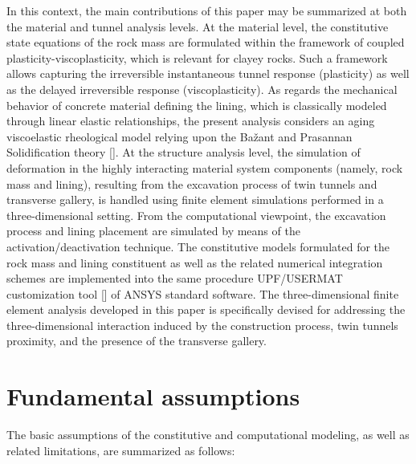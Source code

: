 \documentclass[a4paper,fleqn]{cas-sc}
\begin{document}
In this context, the main contributions of this paper may be summarized at both the material and tunnel analysis levels. At the material level, the constitutive state equations of the rock mass are formulated within the framework of coupled plasticity-viscoplasticity, which is relevant for clayey rocks. Such a framework allows capturing the irreversible instantaneous tunnel response (plasticity) as well as the delayed irreversible response (viscoplasticity).  As regards the mechanical behavior of concrete material defining the lining, which is classically modeled through linear elastic relationships, the present analysis considers an aging viscoelastic rheological model relying upon the Bažant and Prasannan Solidification theory []. At the structure analysis level, the simulation of deformation in the highly interacting material system components (namely, rock mass and lining), resulting from the excavation process of twin tunnels and transverse gallery, is handled using finite element simulations performed in a three-dimensional setting. From the computational viewpoint, the excavation process and lining placement are simulated by means of the activation/deactivation technique. The constitutive models formulated for the rock mass and lining constituent as well as the related numerical integration schemes are implemented into the same procedure UPF/USERMAT customization tool [] of ANSYS standard software. The three-dimensional finite element analysis developed in this paper is specifically devised for addressing the three-dimensional interaction induced by the construction process, twin tunnels proximity, and the presence of the transverse gallery.

\section{Fundamental assumptions}\label{}

The basic assumptions of the constitutive and computational modeling, as well as related limitations, are summarized as follows:
\end{document}
